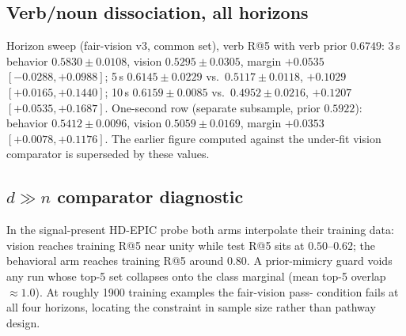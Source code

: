 \subsection{Verb/noun dissociation, all horizons}
Horizon sweep (fair-vision v3, common set), verb R@5 with verb prior $0.6749$:
3\,s behavior $0.5830\pm0.0108$, vision $0.5295\pm0.0305$, margin $+0.0535$
$[-0.0288, +0.0988]$; 5\,s $0.6145\pm0.0229$ vs.\ $0.5117\pm0.0118$, $+0.1029$
$[+0.0165, +0.1440]$; 10\,s $0.6159\pm0.0085$ vs.\ $0.4952\pm0.0216$, $+0.1207$
$[+0.0535, +0.1687]$. One-second row (separate subsample, prior $0.5922$):
behavior $0.5412\pm0.0096$, vision $0.5059\pm0.0169$, margin $+0.0353$
$[+0.0078, +0.1176]$. The earlier figure computed against the under-fit vision comparator is superseded by these values.

\subsection{\texorpdfstring{$d \gg n$}{d >> n} comparator diagnostic}
In the signal-present HD-EPIC probe both arms interpolate their training data:
vision reaches training R@5 near unity while test R@5 sits at $0.50$--$0.62$; the
behavioral arm reaches training R@5 around $0.80$. A prior-mimicry guard voids any
run whose top-5 set collapses onto the class marginal (mean top-5 overlap
$\approx 1.0$). At roughly \num{1900} training examples the fair-vision pass-
condition fails at all four horizons, locating the constraint in sample size
rather than pathway design.